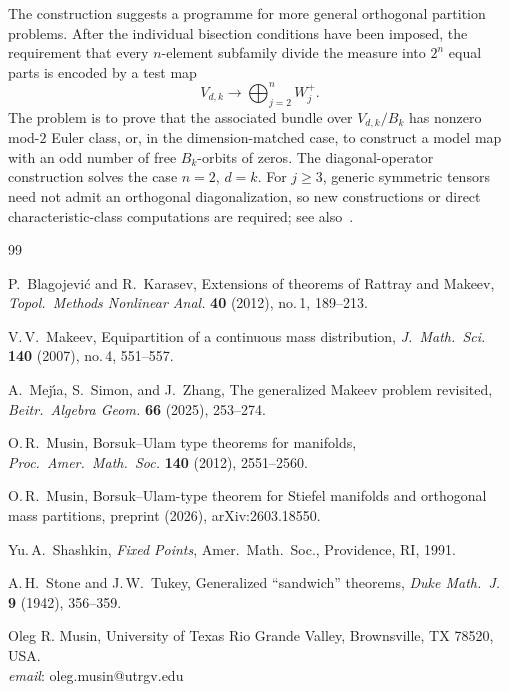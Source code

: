 \documentclass[12pt]{article}
\begin{document}
The construction suggests a programme for more general orthogonal
partition problems.  After the individual bisection conditions have
been imposed, the requirement that every $n$-element subfamily divide
the measure into $2^n$ equal parts is encoded by a test map
\[
 V_{d,k}\longrightarrow \bigoplus_{j=2}^{n}W_j^+.
\]
The problem is to prove that the associated bundle over $V_{d,k}/B_k$
has nonzero mod-$2$ Euler class, or, in the dimension-matched case, to
construct a model map with an odd number of free $B_k$-orbits of zeros.
The diagonal-operator construction solves the case $n=2$, $d=k$.
For $j\ge3$, generic symmetric tensors need not admit an orthogonal
diagonalization, so new constructions or direct characteristic-class
computations are required; see also~\cite{Mus26}.

\begin{thebibliography}{99}
\small
\setlength{\itemsep}{0pt}



P.~Blagojevi\'{c} and R.~Karasev,
Extensions of theorems of Rattray and Makeev,
\textit{Topol.\ Methods Nonlinear Anal.} \textbf{40} (2012), no.\,1, 189--213.

V.\,V.~Makeev,
Equipartition of a continuous mass distribution,
\textit{J.\ Math.\ Sci.} \textbf{140} (2007), no.\,4, 551--557.

A.~Mej\'{\i}a, S.~Simon, and J.~Zhang,
The generalized Makeev problem revisited,
\textit{Beitr.\ Algebra Geom.} \textbf{66} (2025), 253--274.


O.\,R.~Musin,
Borsuk--Ulam type theorems for manifolds,
\textit{Proc.\ Amer.\ Math.\ Soc.} \textbf{140} (2012), 2551--2560.

O.\,R.~Musin,
Borsuk--Ulam-type theorem for Stiefel manifolds and orthogonal
mass partitions,
preprint (2026), arXiv:2603.18550.

Yu.\,A.~Shashkin,
\textit{Fixed Points},
Amer.\ Math.\ Soc., Providence, RI, 1991.

A.\,H.~Stone and J.\,W.~Tukey,
Generalized ``sandwich'' theorems,
\textit{Duke Math.\ J.} \textbf{9} (1942), 356--359.

\end{thebibliography}

\medskip
\noindent\small Oleg R. Musin,
University of Texas Rio Grande Valley,
Brownsville, TX 78520, USA.\\
\textit{email}: oleg.musin@utrgv.edu
\end{document}
